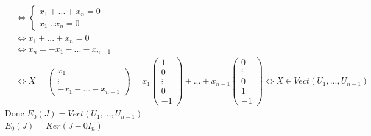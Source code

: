 \documentclass{article}
\begin{document}
\begin{align*}
    &\Leftrightarrow \begin{cases}
        x_1 + ... + x_n = 0\\
        x_1 ... x_n = 0
    \end{cases}\\
    &\Leftrightarrow x_1 +...+x_n = 0\\
    &\Leftrightarrow x_n = -x_1 -...-x_{n-1}\\
    &\Leftrightarrow X = \begin{pmatrix}
        x_1\\\vdots\\-x_1-...-x_{n-1}
    \end{pmatrix} = x_1 \begin{pmatrix}
        1\\0\\\vdots\\0\\-1
    \end{pmatrix} +...+x_{n-1}\begin{pmatrix}
        0\\\vdots\\0\\1\\-1
    \end{pmatrix}
    \Leftrightarrow X \in Vect(U_1,...,U_{n-1})
\end{align*}
Donc \(E_0 (J) = Vect(U_1,...,U_{n-1})\)\\
\(E_0(J) = Ker(J-0I_n)\)\\
\end{document}
